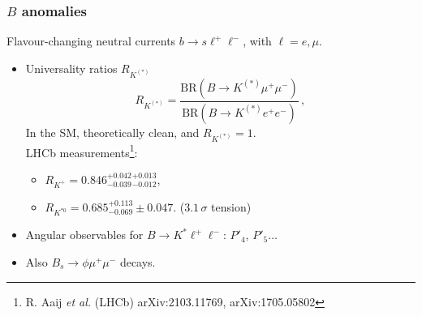 \documentclass[mathserif, 10pt]{beamer}
\begin{document}
\begin{frame}\frametitle{$B$ anomalies}

    Flavour-changing neutral currents $b \to s \ell^+ \ell^-$, with $\ell = e, \mu$.
    \begin{itemize}
        \item Universality ratios $R_{K^{(*)}}$
              $$R_{K^{(*)}} = \frac{\mathrm{BR}(B\to K^{(*)}\mu^+ \mu^-)}{\mathrm{BR}(B\to K^{(*)}e^+ e^-)}\,, $$
              In the SM, theoretically clean, and $R_{K^{(*)}}=1$.\\
              LHCb measurements\footnote{R. Aaij \textit{et al.} (LHCb) arXiv:2103.11769, arXiv:1705.05802}:
              \begin{itemize}
                  \item $R_{K^+} = 0.846^{+0.042}_{-0.039}{}^{+0.013}_{-0.012}$,
                  \item $R_{K^{*0}} = 0.685^{+0.113}_{-0.069}\pm0.047$. ($3.1\,\sigma$ tension)
              \end{itemize}
        \item Angular observables for $B\to K^* \ell^+\ell^-$: $P'_4$, $P'_5\ldots$
        \item Also $B_s \to \phi \mu^+ \mu^-$ decays.
    \end{itemize}

\end{frame}
\end{document}
